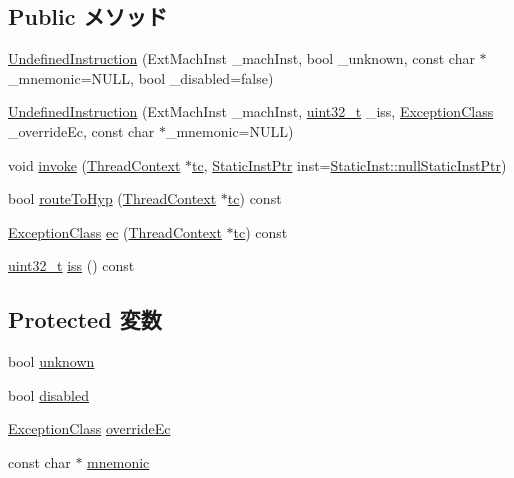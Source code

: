 \subsection*{Public メソッド}
\begin{DoxyCompactItemize}
\item 
\hyperlink{classArmISA_1_1UndefinedInstruction_a4896cdc6731c9fc601e3d5ce8ca26c6e}{UndefinedInstruction} (ExtMachInst \_\-machInst, bool \_\-unknown, const char $\ast$\_\-mnemonic=NULL, bool \_\-disabled=false)
\item 
\hyperlink{classArmISA_1_1UndefinedInstruction_a5eb139880bd865099005b05ea572a0a8}{UndefinedInstruction} (ExtMachInst \_\-machInst, \hyperlink{Type_8hh_a435d1572bf3f880d55459d9805097f62}{uint32\_\-t} \_\-iss, \hyperlink{namespaceArmISA_a04034d12009cf36227f4d2abff3331a2}{ExceptionClass} \_\-overrideEc, const char $\ast$\_\-mnemonic=NULL)
\item 
void \hyperlink{classArmISA_1_1UndefinedInstruction_a2bd783b42262278d41157d428e1f8d6f}{invoke} (\hyperlink{classThreadContext}{ThreadContext} $\ast$\hyperlink{namespaceArmISA_a5aff829af55e65b802d83dfcef4e9dd0}{tc}, \hyperlink{classRefCountingPtr}{StaticInstPtr} inst=\hyperlink{classStaticInst_aa793d9793af735f09096369fb17567b6}{StaticInst::nullStaticInstPtr})
\item 
bool \hyperlink{classArmISA_1_1UndefinedInstruction_a16facd13ba8e6d15d2b865882c379d5f}{routeToHyp} (\hyperlink{classThreadContext}{ThreadContext} $\ast$\hyperlink{namespaceArmISA_a5aff829af55e65b802d83dfcef4e9dd0}{tc}) const 
\item 
\hyperlink{namespaceArmISA_a04034d12009cf36227f4d2abff3331a2}{ExceptionClass} \hyperlink{classArmISA_1_1UndefinedInstruction_aefab73b22a74d7c48b8a23230906d7cd}{ec} (\hyperlink{classThreadContext}{ThreadContext} $\ast$\hyperlink{namespaceArmISA_a5aff829af55e65b802d83dfcef4e9dd0}{tc}) const 
\item 
\hyperlink{Type_8hh_a435d1572bf3f880d55459d9805097f62}{uint32\_\-t} \hyperlink{classArmISA_1_1UndefinedInstruction_a54f4d33ac162a95fd5b3830cf7fab8ff}{iss} () const 
\end{DoxyCompactItemize}
\subsection*{Protected 変数}
\begin{DoxyCompactItemize}
\item 
bool \hyperlink{classArmISA_1_1UndefinedInstruction_ac160cc61da581bdcf075273493b9f156}{unknown}
\item 
bool \hyperlink{classArmISA_1_1UndefinedInstruction_a4295e1a543aa3694e2987c6731c226ad}{disabled}
\item 
\hyperlink{namespaceArmISA_a04034d12009cf36227f4d2abff3331a2}{ExceptionClass} \hyperlink{classArmISA_1_1UndefinedInstruction_af5e67d95019a0b5aba4c42205567eda7}{overrideEc}
\item 
const char $\ast$ \hyperlink{classArmISA_1_1UndefinedInstruction_adfacb526b8ab378bf36f1324303635d0}{mnemonic}
\end{DoxyCompactItemize}


